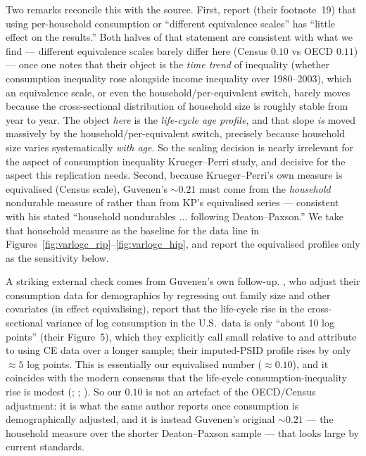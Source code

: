 \documentclass[11pt,fleqn]{article}
\begin{document}
Two remarks reconcile this with the source. First, \cite{KruegerPerri2006} report (their
footnote~19) that using per-household consumption or ``different equivalence scales'' has
``little effect on the results.'' Both halves of that statement are consistent with what we
find --- different equivalence scales barely differ here (Census $0.10$ vs OECD $0.11$) ---
once one notes that their object is the \emph{time trend} of inequality (whether consumption
inequality rose alongside income inequality over 1980--2003), which an equivalence scale, or
even the household/per-equivalent switch, barely moves because the cross-sectional
distribution of household size is roughly stable from year to year. The object \emph{here}
is the \emph{life-cycle age profile}, and that slope \emph{is} moved massively by the
household/per-equivalent switch, precisely because household size varies systematically
\emph{with age}. So the scaling decision is nearly irrelevant for the aspect of consumption
inequality Krueger--Perri study, and decisive for the aspect this replication needs. Second,
because Krueger--Perri's own measure is equivalised (Census scale), Guvenen's $\sim\!0.21$
must come from the \emph{household} nondurable measure of \cite{DeatonPaxson1994} rather than
from KP's equivalised series --- consistent with his stated ``household nondurables
$\ldots$ following Deaton--Paxson.'' We take that household measure as the baseline for the
data line in Figures~\ref{fig:varlogc_rip}--\ref{fig:varlogc_hip}, and report the equivalised
profiles only as the sensitivity below.

A striking external check comes from Guvenen's own follow-up. \cite{GuvenenSmith2014}, who
adjust their consumption data for demographics by regressing out family size and other
covariates (in effect equivalising), report that the life-cycle rise in the cross-sectional
variance of log consumption in the U.S.\ data is only ``about 10 log points'' (their
Figure~5), which they explicitly call small relative to \cite{DeatonPaxson1994} and
attribute to using CE data over a longer sample; their imputed-PSID profile rises by only
$\approx5$ log points. This is essentially our equivalised number ($\approx0.10$), and it
coincides with the modern consensus that the life-cycle consumption-inequality rise is
modest (\citealp{HeathcotePerriViolante2010}; \citealp{Kaplan2012}; \citealp{AguiarHurst2013}).
So our $0.10$ is not an artefact of the OECD/Census adjustment: it is what the same author
reports once consumption is demographically adjusted, and it is instead Guvenen's original
$\sim\!0.21$ --- the household measure over the shorter Deaton--Paxson sample --- that looks
large by current standards.
\end{document}
